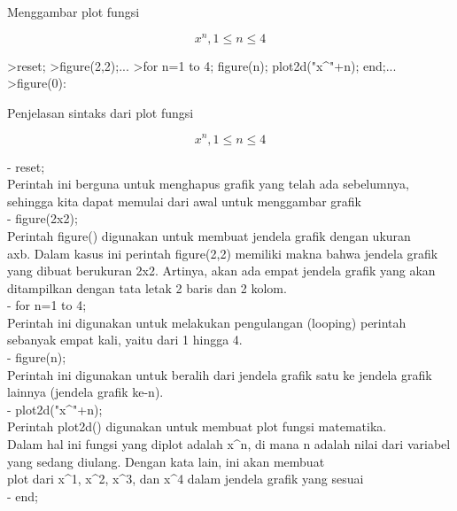\documentclass{article}
\begin{document}
\begin{eulernotebook}
\begin{eulercomment}
\begin{eulercomment}
\begin{eulercomment}
\begin{eulercomment}
\begin{eulercomment}
Menggambar plot fungsi\\
\end{eulercomment}
\begin{eulerformula}
\[
x^n, 1 \leq n \leq 4
\]
\end{eulerformula}
\begin{eulerprompt}
>reset;
>figure(2,2);...
>for n=1 to 4; figure(n); plot2d("x^"+n); end;...
>figure(0):
\end{eulerprompt}
\begin{eulercomment}
Penjelasan sintaks dari plot fungsi

\end{eulercomment}
\begin{eulerformula}
\[
x^n,  1 \leq n \leq 4
\]
\end{eulerformula}
\begin{eulercomment}
- reset;\\
Perintah ini berguna untuk menghapus grafik yang telah ada sebelumnya,
sehingga kita dapat memulai dari awal untuk menggambar grafik\\
- figure(2x2);\\
Perintah figure() digunakan untuk membuat jendela grafik dengan ukuran\\
axb. Dalam kasus ini perintah figure(2,2) memiliki makna bahwa jendela
grafik yang dibuat berukuran 2x2. Artinya, akan ada empat jendela
grafik yang akan ditampilkan dengan tata letak 2 baris dan 2 kolom.\\
- for n=1 to 4;\\
Perintah ini digunakan untuk melakukan pengulangan (looping) perintah
sebanyak empat kali, yaitu dari 1 hingga 4.\\
- figure(n);\\
Perintah ini digunakan untuk beralih dari jendela grafik satu ke
jendela grafik lainnya (jendela grafik ke-n).\\
- plot2d("x\textasciicircum{}"+n);\\
Perintah plot2d() digunakan untuk membuat plot fungsi matematika.\\
Dalam hal ini fungsi yang diplot adalah x\textasciicircum{}n, di mana n adalah nilai
dari variabel yang sedang diulang. Dengan kata lain, ini akan membuat\\
plot dari x\textasciicircum{}1, x\textasciicircum{}2, x\textasciicircum{}3, dan x\textasciicircum{}4 dalam jendela grafik yang sesuai\\
- end;\\

\end{eulercomment}
\end{eulercomment}
\end{eulercomment}
\end{eulercomment}
\end{eulercomment}
\end{eulernotebook}
\end{document}
